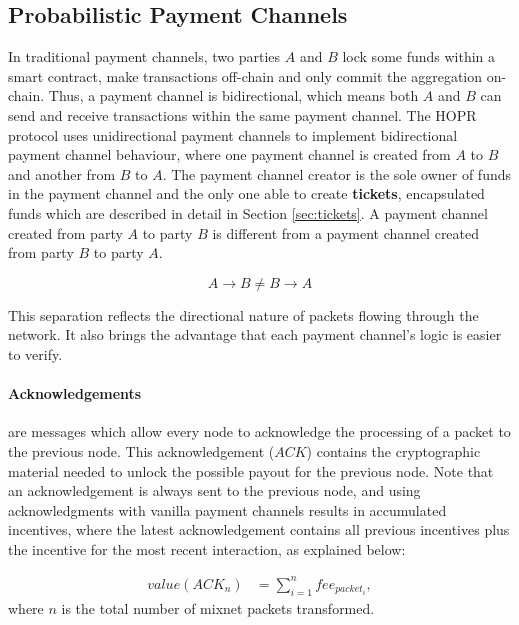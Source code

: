 \subsection{Probabilistic Payment Channels}
\label{sec:incentives:probabilistic}



In traditional payment channels, two parties $A$ and $B$ lock some funds within a smart contract, make transactions off-chain and only commit the aggregation on-chain. Thus, a payment channel is bidirectional, which means both $A$ and $B$ can send and receive transactions within the same payment channel. The HOPR protocol uses unidirectional payment channels to implement bidirectional payment channel behaviour, where one payment channel is created from $A$ to $B$ and another from $B$ to $A$. The payment channel creator is the sole owner of funds in the payment channel and the only one able to create \textbf{tickets}, encapsulated funds which are described in detail in Section \ref{sec:tickets}. A payment channel created from party $A$ to party $B$ is different from a payment channel created from party $B$ to party $A$.

$$A\rightarrow B \neq B\rightarrow A$$

This separation reflects the directional nature of packets flowing through the network. It also brings the advantage that each payment channel's logic is easier to verify.

\paragraph{Acknowledgements} are messages which allow every node to acknowledge the processing of a packet to the previous node. This acknowledgement ($ACK$) contains the cryptographic material needed to unlock the possible payout for the previous node. Note that an acknowledgement is always sent to the previous node, and using acknowledgments with vanilla payment channels results in accumulated incentives, where the latest acknowledgement contains all previous incentives plus the incentive for the most recent interaction, as explained below:

\begin{align}
    value (ACK_n) & =\sum_{i=1}^nfee_{packet_i},
\end{align}
where $n$ is the total number of mixnet packets transformed.

